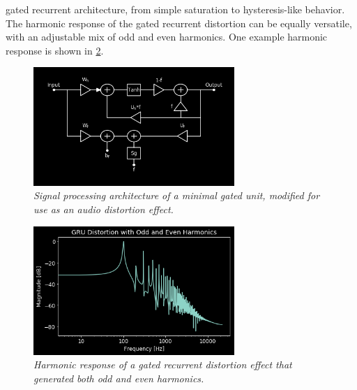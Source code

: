 \documentclass[twoside,a4paper]{article}
\begin{document}
gated recurrent architecture, from simple saturation to hysteresis-like
behavior. The harmonic response of the gated recurrent distortion can be
equally versatile, with an adjustable mix of odd and even harmonics.
One example harmonic response is shown in \cref{gru-harm}.
%
\begin{figure}[!htb]
    \center
    \includegraphics[width=3in]{../GatedRecurrentDistortion/Pics/gru_arch.png}
    \caption{\label{gru-arch}{\it Signal processing architecture of a minimal
    gated unit, modified for use as an audio distortion effect.}}
\end{figure}
%
\begin{figure}[!htb]
    \center
    \includegraphics[width=3in]{../GatedRecurrentDistortion/Pics/all_harm.png}
    \caption{\label{gru-harm}{\it Harmonic response of a gated recurrent distortion
    effect that generated both odd and even harmonics.}}
\end{figure}
%
\end{document}
